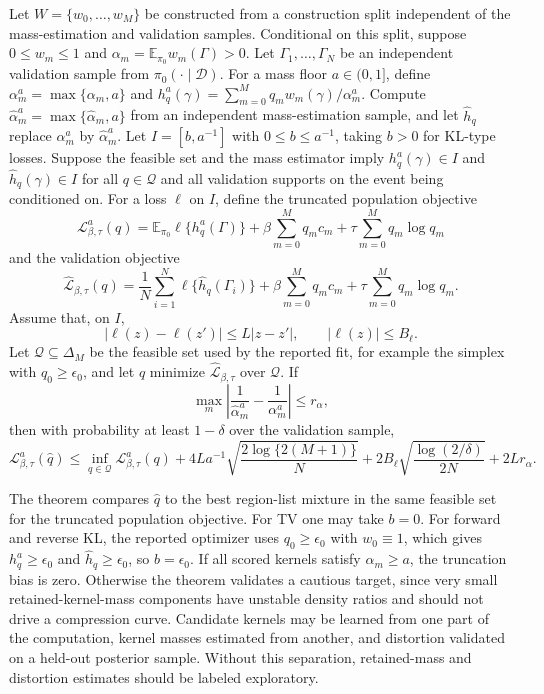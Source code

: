 \documentclass[twoside,11pt]{article}
\newcommand{\D}{\mathcal{D}}
\newcommand{\E}{\mathbb{E}}
\begin{document}
\begin{theorem}
\label{thm:empiricalcertification}
Let \(W=\{w_0,\dots,w_M\}\) be constructed from a construction split independent of the mass-estimation and validation samples. Conditional on this split, suppose \(0\le w_m\le1\) and \(\alpha_m=\E_{\pi_0}w_m(\Gamma)>0\). Let \(\Gamma_1,\dots,\Gamma_N\) be an independent validation sample from \(\pi_0(\cdot\mid\D)\). For a mass floor \(a\in(0,1]\), define \(\alpha_m^a=\max\{\alpha_m,a\}\) and \(h_q^a(\gamma)=\sum_{m=0}^Mq_mw_m(\gamma)/\alpha_m^a\). Compute \(\widehat\alpha_m^a=\max\{\widehat\alpha_m,a\}\) from an independent mass-estimation sample, and let \(\widehat h_q\) replace \(\alpha_m^a\) by \(\widehat\alpha_m^a\). Let \(I=[b,a^{-1}]\) with \(0\le b\le a^{-1}\), taking \(b>0\) for KL-type losses. Suppose the feasible set and the mass estimator imply \(h_q^a(\gamma)\in I\) and \(\widehat h_q(\gamma)\in I\) for all \(q\in\mathcal Q\) and all validation supports on the event being conditioned on. For a loss \(\ell\) on \(I\), define the truncated population objective
\[
\mathcal L_{\beta,\tau}^a(q) = \E_{\pi_0}\ell\{h_q^a(\Gamma)\} + \beta\sum_{m=0}^M q_m c_m + \tau\sum_{m=0}^M q_m\log q_m
\]
and the validation objective
\[
\widehat{\mathcal L}_{\beta,\tau}(q) = \frac1N\sum_{i=1}^N\ell\{\widehat h_q(\Gamma_i)\} + \beta\sum_{m=0}^M q_m c_m + \tau\sum_{m=0}^M q_m\log q_m.
\]
Assume that, on \(I\),
\[
|\ell(z)-\ell(z')|\le L|z-z'|, \qquad |\ell(z)|\le B_\ell.
\]
Let \(\mathcal Q\subseteq\Delta_M\) be the feasible set used by the reported fit, for example the simplex with \(q_0\ge\epsilon_0\), and let \(\widehat q\) minimize \(\widehat{\mathcal L}_{\beta,\tau}\) over \(\mathcal Q\). If
\[
\max_m\left| \frac1{\widehat\alpha_m^a} - \frac1{\alpha_m^a} \right| \le r_\alpha,
\]
then with probability at least $1-\delta$ over the validation sample,
\[
\mathcal L_{\beta,\tau}^a(\widehat q) \le \inf_{q\in\mathcal Q}\mathcal L_{\beta,\tau}^a(q) + 4La^{-1}\sqrt{\frac{2\log\{2(M+1)\}}{N}} + 2B_\ell\sqrt{\frac{\log(2/\delta)}{2N}} + 2L r_\alpha.
\]
\end{theorem}

The theorem compares \(\widehat q\) to the best region-list mixture in the same feasible set for the truncated population objective. For TV one may take \(b=0\). For forward and reverse KL, the reported optimizer uses \(q_0\ge\epsilon_0\) with \(w_0\equiv1\), which gives \(h_q^a\ge\epsilon_0\) and \(\widehat h_q\ge\epsilon_0\), so \(b=\epsilon_0\). If all scored kernels satisfy \(\alpha_m\ge a\), the truncation bias is zero. Otherwise the theorem validates a cautious target, since very small retained-kernel-mass components have unstable density ratios and should not drive a compression curve. Candidate kernels may be learned from one part of the computation, kernel masses estimated from another, and distortion validated on a held-out posterior sample. Without this separation, retained-mass and distortion estimates should be labeled exploratory.
\end{document}

